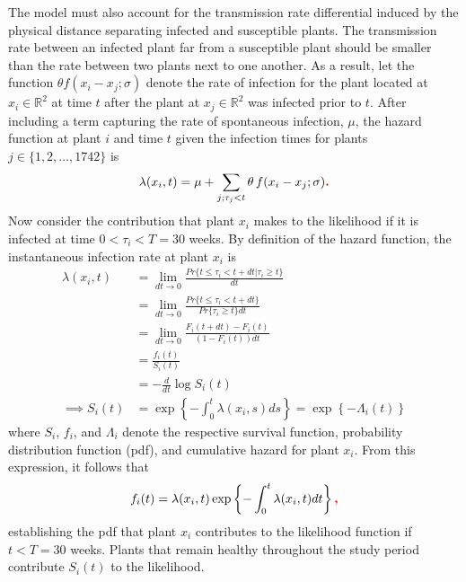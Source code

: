 \documentclass{uwstat572}
\newcommand{\vmadd}[1]{\textbf{\color{red}{#1}}}
\begin{document}
The model must also account for the transmission rate differential induced by the physical distance separating infected and susceptible plants. 
The transmission rate between an infected plant far from a susceptible plant should be smaller than the rate between two plants next to one another.
As a result, let the function $\theta f(x_i -x_j; \sigma)$ denote the rate of infection for the plant located at $x_i \in \mathbb{R}^2$ at time $t$ after the plant at $x_j \in \mathbb{R}^2$ was infected prior to $t$. 
After including a term capturing the rate of spontaneous infection, $\mu$, the hazard function at plant $i$ and time $t$ given the infection times for plants $j \in \{1, 2, \dots, 1742\}$ is 
$$\lambda(x_i,t) = \mu + \sum_{j; \tau_j<t} \theta \, f(x_i - x_j; \sigma)\vmadd{.}$$
Now consider the contribution that plant $x_i$ makes to the likelihood if it is infected at time $0<\tau_i<T=30$ weeks. 
By definition of the hazard function, the instantaneous infection rate at plant $x_i$ is
\begin{align*}
\lambda(x_i, t) &= \lim_{dt \to 0} \frac{Pr\{ t \le \tau_i < t+dt | \tau_i \ge t \}}{dt} \\
	&= \lim_{dt \to 0} \frac{Pr\{ t \le \tau_i < t+dt\}}{Pr\{\tau_i\ge t\}dt}\\
	&= \lim_{dt \to 0} \frac{F_i(t+dt) - F_i(t)}{(1-F_i(t))dt} \\
	&= \frac{f_i(t)}{S_i(t)}\\
	&= -\frac{d}{dt} \log S_i(t) \\
\implies S_i(t) &= \exp \left\{ - \int_0^t \lambda(x_i,s) ds  \right\} = \exp \left\{ - \Lambda_i(t)  \right\}
\end{align*}
where $S_i$, $f_i$, and $\Lambda_i$ denote the respective survival function, probability distribution function (pdf), and cumulative hazard for plant $x_i$. 
From this expression, it follows that
$$ f_i(t) = \lambda(x_i,t) \exp \left\{ - \int_0^t \lambda(x_i,t) dt  \right\}\vmadd{,}$$
establishing the pdf that plant $x_i$ contributes to the likelihood function if $t<T=30$ weeks. 
Plants that remain healthy throughout the study period contribute $S_i(t)$ to the likelihood. 
\end{document}
